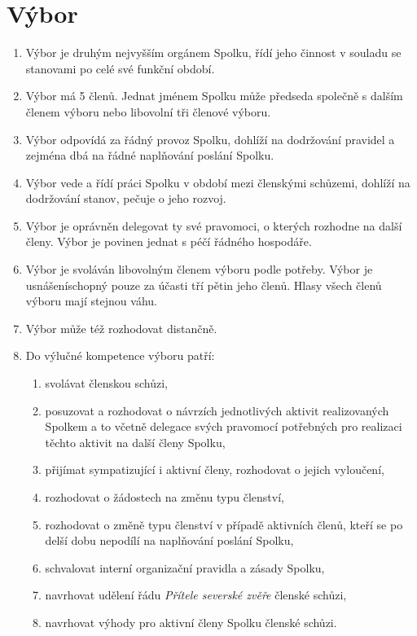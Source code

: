 \documentclass[11pt,a4paper]{article}
\begin{document}
\section{Výbor}
\begin{enumerate}[itemsep=0pt]
    \item Výbor je druhým nejvyšším orgánem Spolku, řídí jeho činnost v souladu 
    se stanovami po celé své funkční období. 
    \item Výbor má 5 členů. Jednat jménem Spolku může 
    předseda společně s dalším členem výboru nebo libovolní tři členové výboru.
    \item Výbor odpovídá za řádný provoz Spolku, dohlíží na dodržování pravidel 
    a zejména dbá na řádné naplňování poslání Spolku.
    \item Výbor vede a řídí práci Spolku v období mezi členskými schůzemi, 
    dohlíží na dodržování stanov, pečuje o jeho rozvoj.
    \item Výbor je oprávněn delegovat ty své pravomoci, o kterých rozhodne na 
    další členy. Výbor je povinen jednat s péčí řádného hospodáře. 
    \item Výbor je svoláván libovolným členem výboru podle potřeby. Výbor je 
    usnášeníschopný pouze za účasti tří pětin jeho členů. Hlasy všech členů 
    výboru mají stejnou váhu.
    \item Výbor může též rozhodovat distančně.
    \item Do výlučné kompetence výboru patří: 
    \begin{enumerate}[itemsep=0pt,topsep=0pt]
        \item svolávat členskou schůzi, 
        \item posuzovat a rozhodovat o návrzích jednotlivých aktivit 
        realizovaných Spolkem a to včetně delegace svých pravomocí potřebných 
        pro realizaci těchto aktivit na další členy Spolku,
        \item přijímat sympatizující i aktivní členy, rozhodovat o jejich 
        vyloučení,
        \item rozhodovat o žádostech na změnu typu členství,
        \item rozhodovat o změně typu členství v případě aktivních členů, kteří se po delší dobu nepodílí na naplňování poslání Spolku,
        \item schvalovat interní organizační pravidla a zásady Spolku,
        \item navrhovat udělení řádu \textit{Přítele severské zvěře} členské schůzi,
        \item navrhovat výhody pro aktivní členy Spolku členské schůzi.
    \end{enumerate}
\end{enumerate}
\end{document}
